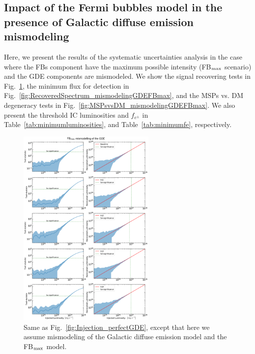 \documentclass[doublespace,nopageskip]{VTthesis} %
\begin{document}
\subsection{Impact of the Fermi bubbles model in the presence of Galactic diffuse emission mismodeling}
\label{appdx:FBmaxandmismodeling}

Here, we present the results of the systematic uncertainties analysis in the case where the FBs component have the maximum possible intensity (FB$_{\rm max}$ scenario) and the GDE components are mismodeled. We show the signal recovering tests in Fig.~\ref{fig:InjectionmismodelingFBmax}, the minimum flux for detection in Fig.~\ref{fig:RecoveredSpectrum_mismodelingGDEFBmax}, and the MSPs vs. DM degeneracy tests in Fig.~\ref{fig:MSPsvsDM_mismodelingGDEFBmax}. We also present the threshold IC luminosities and $f_{e^\pm}$ in Table~\ref{tab:minimumluminosities}, and Table~\ref{tab:minimumfe}, respectively.

\begin{figure}
    \begin{center}
    \includegraphics[width=0.6\textwidth]{Figures/CTA/all-TS-mis-True-Fermi-min-False.pdf}
    \caption{Same as Fig.~\ref{fig:Injection_perfectGDE}, except that here we assume mismodeling of the Galactic diffuse emission model and the FB$_{\rm max}$ model.}\label{fig:InjectionmismodelingFBmax}
    \end{center}
\end{figure}
\end{document}
